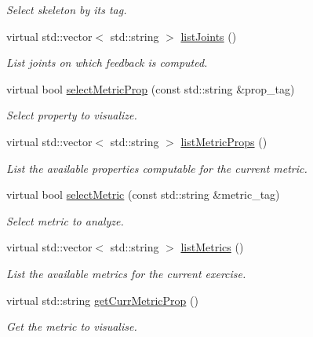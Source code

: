 \begin{DoxyCompactItemize}
\begin{DoxyCompactList}\small\item\em Select skeleton by its tag. \end{DoxyCompactList}\item 
virtual std\+::vector$<$ std\+::string $>$ \hyperlink{classmotionAnalyzer__IDL_aaec274413bf24d3e213ce6cfb2592748}{list\+Joints} ()
\begin{DoxyCompactList}\small\item\em List joints on which feedback is computed. \end{DoxyCompactList}\item 
virtual bool \hyperlink{classmotionAnalyzer__IDL_a964bfaa136ee53f793260747531a9cb2}{select\+Metric\+Prop} (const std\+::string \&prop\+\_\+tag)
\begin{DoxyCompactList}\small\item\em Select property to visualize. \end{DoxyCompactList}\item 
virtual std\+::vector$<$ std\+::string $>$ \hyperlink{classmotionAnalyzer__IDL_a05b2616e56207a2acc4dbc4429f56609}{list\+Metric\+Props} ()
\begin{DoxyCompactList}\small\item\em List the available properties computable for the current metric. \end{DoxyCompactList}\item 
virtual bool \hyperlink{classmotionAnalyzer__IDL_a7e166c4cc32ecf37cf1a3e0235e0bb4d}{select\+Metric} (const std\+::string \&metric\+\_\+tag)
\begin{DoxyCompactList}\small\item\em Select metric to analyze. \end{DoxyCompactList}\item 
virtual std\+::vector$<$ std\+::string $>$ \hyperlink{classmotionAnalyzer__IDL_a139730029d1e7112eb66636c21fe99c8}{list\+Metrics} ()
\begin{DoxyCompactList}\small\item\em List the available metrics for the current exercise. \end{DoxyCompactList}\item 
virtual std\+::string \hyperlink{classmotionAnalyzer__IDL_a2caac2fd16a9abd91b59615dbb717c88}{get\+Curr\+Metric\+Prop} ()
\begin{DoxyCompactList}\small\item\em Get the metric to visualise. \end{DoxyCompactList}\item 

\end{DoxyCompactItemize}
